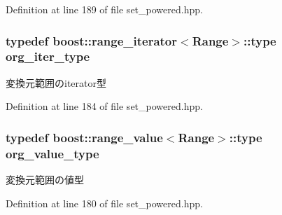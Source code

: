 \-Definition at line 189 of file set\-\_\-powered.\-hpp.

\hypertarget{classyuh_1_1range__detail_1_1set__powered__range_a7d85ad9a5f85d7a869dd7ea9557eee8b}{
\subsubsection[{org\-\_\-iter\-\_\-type}]{\setlength{\rightskip}{0pt plus 5cm}typedef boost\-::range\-\_\-iterator$<$\-Range$>$\-::type {\bf org\-\_\-iter\-\_\-type}}}\label{df/db5/classyuh_1_1range__detail_1_1set__powered__range_a7d85ad9a5f85d7a869dd7ea9557eee8b}
変換元範囲のiterator型 

\-Definition at line 184 of file set\-\_\-powered.\-hpp.

\hypertarget{classyuh_1_1range__detail_1_1set__powered__range_a69559cacbf423e64c6efb8e1644ea37e}{
\subsubsection[{org\-\_\-value\-\_\-type}]{\setlength{\rightskip}{0pt plus 5cm}typedef boost\-::range\-\_\-value$<$\-Range$>$\-::type {\bf org\-\_\-value\-\_\-type}}}\label{df/db5/classyuh_1_1range__detail_1_1set__powered__range_a69559cacbf423e64c6efb8e1644ea37e}
変換元範囲の値型 

\-Definition at line 180 of file set\-\_\-powered.\-hpp.



